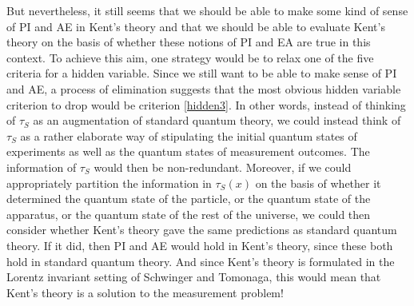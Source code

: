 But nevertheless, it still seems that we should be able to make some kind of sense of PI and AE in Kent's theory and that we should be able to evaluate Kent's theory on the basis of whether these notions of PI and EA are true in this context. To achieve this aim, one strategy would be to relax one of the five criteria for a hidden variable. Since we still want to be able to make sense of PI and AE,  a process of elimination suggests that the most obvious hidden variable criterion to drop would be criterion \ref{hidden3}. In other words, instead of thinking of $\tau_S$ as an augmentation of standard quantum theory, we could instead think of $\tau_S$ as a rather elaborate way of stipulating the initial quantum states of experiments as well as the quantum states of measurement outcomes. The information of $\tau_S$ would then be non-redundant. Moreover, if we could appropriately partition the information in $\tau_S(x)$ on the basis of whether it determined the quantum state of the particle, or the quantum state of the apparatus, or the quantum state of the rest of the universe, we could then consider whether Kent's theory gave the same predictions as standard quantum theory. If it did, then PI and AE would hold in Kent's theory, since these both hold in standard quantum theory. And since Kent's theory is formulated in the Lorentz invariant setting of Schwinger and Tomonaga, this would mean that Kent's theory is a solution to the measurement problem!
